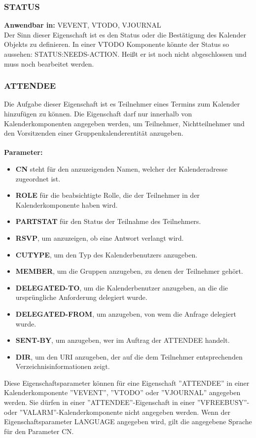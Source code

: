 \subsubsection{STATUS}
\label{sec:status}
\textbf{Anwendbar in:} VEVENT, VTODO, VJOURNAL\\
Der Sinn dieser Eigenschaft ist es den Status oder die Bestätigung des Kalender Objekts zu definieren. In einer VTODO Komponente könnte der Status so aussehen: STATUS:NEEDS-ACTION. Heißt er ist noch nicht abgeschlossen und muss noch bearbeitet werden.
\subsubsection{ATTENDEE}
\label{sec:attendee}
Die Aufgabe dieser Eigenschaft ist es Teilnehmer eines Termins zum Kalender hinzufügen zu können. Die Eigenschaft darf nur innerhalb von Kalenderkomponenten angegeben werden, um Teilnehmer, Nichtteilnehmer und den Vorsitzenden einer Gruppenkalenderentität anzugeben. \\ \\ 
\textbf{Parameter:}
\begin{itemize}
 \item \textbf{CN} steht für den anzuzeigenden Namen, welcher der Kalenderadresse zugeordnet ist.
 \item \textbf{ROLE} für die beabsichtigte Rolle, die der Teilnehmer in der Kalenderkomponente haben wird.
 \item \textbf{PARTSTAT} für den Status der Teilnahme des Teilnehmers.
 \item \textbf{RSVP}, um anzuzeigen, ob eine Antwort verlangt wird.
 \item \textbf{CUTYPE}, um den Typ des Kalenderbenutzers anzugeben.
 \item \textbf{MEMBER}, um die Gruppen anzugeben, zu denen der Teilnehmer gehört.
 \item \textbf{DELEGATED-TO}, um die Kalenderbenutzer anzugeben, an die die ursprüngliche Anforderung delegiert wurde.
 \item \textbf{DELEGATED-FROM}, um anzugeben, von wem die Anfrage delegiert wurde.
 \item \textbf{SENT-BY}, um anzugeben, wer im Auftrag der ATTENDEE handelt.
 \item \textbf{DIR}, um den URI anzugeben, der auf die dem Teilnehmer entsprechenden Verzeichnisinformationen zeigt.
 \end{itemize} 
Diese Eigenschaftsparameter können für eine Eigenschaft ''ATTENDEE'' in einer Kalenderkomponente ''VEVENT'', ''VTODO'' oder ''VJOURNAL'' angegeben werden. Sie dürfen in einer ''ATTENDEE''-Eigenschaft in einer ''VFREEBUSY''- oder ''VALARM''-Kalenderkomponente nicht angegeben werden. Wenn der Eigenschaftsparameter LANGUAGE angegeben wird, gilt die angegebene Sprache für den Parameter CN. \\ \\

